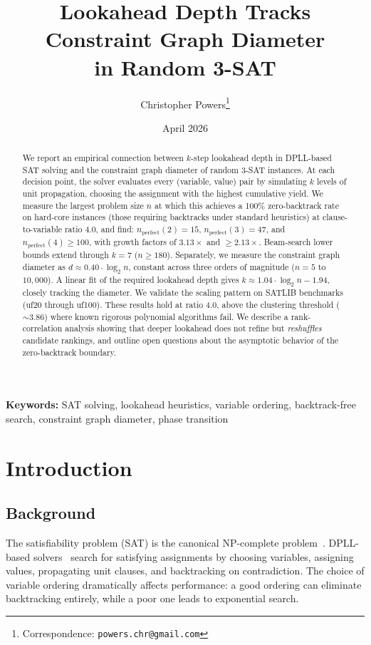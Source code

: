 \documentclass[11pt,a4paper]{article}
\title{Lookahead Depth Tracks Constraint Graph Diameter\\in Random 3-SAT}
\author{Christopher Powers\thanks{Correspondence: \texttt{powers.chr@gmail.com}}}
\date{April 2026}
\begin{document}
\maketitle

\begin{abstract}
We report an empirical connection between $k$-step lookahead depth in DPLL-based SAT solving and the constraint graph diameter of random 3-SAT instances. At each decision point, the solver evaluates every (variable, value) pair by simulating $k$ levels of unit propagation, choosing the assignment with the highest cumulative yield. We measure the largest problem size $n$ at which this achieves a 100\% zero-backtrack rate on hard-core instances (those requiring backtracks under standard heuristics) at clause-to-variable ratio 4.0, and find: $n_{\mathrm{perfect}}(2) = 15$, $n_{\mathrm{perfect}}(3) = 47$, and $n_{\mathrm{perfect}}(4) \geq 100$, with growth factors of $3.13\times$ and ${\geq}2.13\times$. Beam-search lower bounds extend through $k = 7$ ($n \geq 180$). Separately, we measure the constraint graph diameter as $d \approx 0.40 \cdot \log_2 n$, constant across three orders of magnitude ($n = 5$ to $10{,}000$). A linear fit of the required lookahead depth gives $k \approx 1.04 \cdot \log_2 n - 1.94$, closely tracking the diameter. We validate the scaling pattern on SATLIB benchmarks (uf20 through uf100). These results hold at ratio 4.0, above the clustering threshold (${\sim}3.86$) where known rigorous polynomial algorithms fail. We describe a rank-correlation analysis showing that deeper lookahead does not refine but \emph{reshuffles} candidate rankings, and outline open questions about the asymptotic behavior of the zero-backtrack boundary.
\end{abstract}

\noindent\textbf{Keywords:} SAT solving, lookahead heuristics, variable ordering, backtrack-free search, constraint graph diameter, phase transition

\section{Introduction}

\subsection{Background}

The satisfiability problem (SAT) is the canonical NP-complete problem~\citep{cook1971complexity}. DPLL-based solvers~\citep{davis1962machine} search for satisfying assignments by choosing variables, assigning values, propagating unit clauses, and backtracking on contradiction. The choice of variable ordering dramatically affects performance: a good ordering can eliminate backtracking entirely, while a poor one leads to exponential search.
\end{document}

